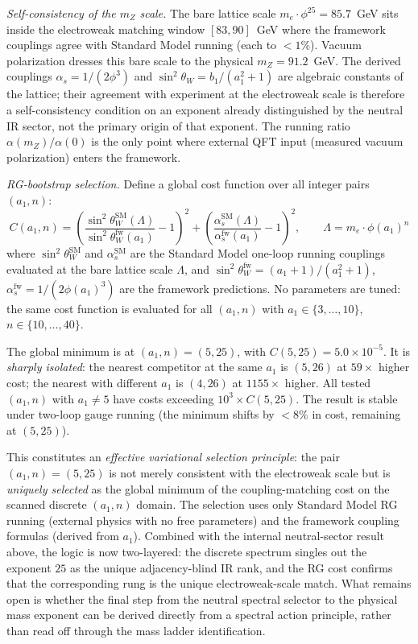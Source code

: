\documentclass[12pt,a4paper]{article}
\theoremstyle{definition}
\begin{document}
\noindent\textit{Self-consistency of the $m_Z$ scale.}  The bare lattice scale $m_e \cdot \phi^{25} = 85.7$~GeV sits inside the electroweak matching window $[83, 90]$~GeV where the framework couplings agree with Standard Model running (each to $< 1\%$).  Vacuum polarization dresses this bare scale to the physical $m_Z = 91.2$~GeV.  The derived couplings $\alpha_s = 1/(2\phi^3)$ and $\sin^2\theta_W = b_1/(a_1^2+1)$ are algebraic constants of the lattice; their agreement with experiment at the electroweak scale is therefore a self-consistency condition on an exponent already distinguished by the neutral IR sector, not the primary origin of that exponent.  The running ratio $\alpha(m_Z)/\alpha(0)$ is the only point where external QFT input (measured vacuum polarization) enters the framework.

\noindent\textit{RG-bootstrap selection.}  Define a global cost function over all integer pairs $(a_1, n)$:
\begin{equation}
C(a_1, n) = \left(\frac{\sin^2\theta_W^{\mathrm{SM}}(\Lambda)}{\sin^2\theta_W^{\mathrm{fw}}(a_1)} - 1\right)^2 + \left(\frac{\alpha_s^{\mathrm{SM}}(\Lambda)}{\alpha_s^{\mathrm{fw}}(a_1)} - 1\right)^2, \qquad \Lambda = m_e \cdot \phi(a_1)^n
\label{eq:rg_cost}
\end{equation}
where $\sin^2\theta_W^{\mathrm{SM}}$ and $\alpha_s^{\mathrm{SM}}$ are the Standard Model one-loop running couplings evaluated at the bare lattice scale $\Lambda$, and $\sin^2\theta_W^{\mathrm{fw}} = (a_1+1)/(a_1^2+1)$, $\alpha_s^{\mathrm{fw}} = 1/(2\phi(a_1)^3)$ are the framework predictions.  No parameters are tuned: the same cost function is evaluated for all $(a_1, n)$ with $a_1 \in \{3, \ldots, 10\}$, $n \in \{10, \ldots, 40\}$.

The global minimum is at $(a_1, n) = (5, 25)$, with $C(5,25) = 5.0 \times 10^{-5}$.  It is \emph{sharply isolated}: the nearest competitor at the same $a_1$ is $(5, 26)$ at $59\times$ higher cost; the nearest with different $a_1$ is $(4, 26)$ at $1155\times$ higher.  All tested $(a_1, n)$ with $a_1 \ne 5$ have costs exceeding $10^3 \times C(5,25)$.  The result is stable under two-loop gauge running (the minimum shifts by $< 8\%$ in cost, remaining at $(5,25)$).

This constitutes an \emph{effective variational selection principle}: the pair $(a_1, n) = (5, 25)$ is not merely consistent with the electroweak scale but is \emph{uniquely selected} as the global minimum of the coupling-matching cost on the scanned discrete $(a_1, n)$ domain.  The selection uses only Standard Model RG running (external physics with no free parameters) and the framework coupling formulas (derived from $a_1$).  Combined with the internal neutral-sector result above, the logic is now two-layered: the discrete spectrum singles out the exponent $25$ as the unique adjacency-blind IR rank, and the RG cost confirms that the corresponding rung is the unique electroweak-scale match.  What remains open is whether the final step from the neutral spectral selector to the physical mass exponent can be derived directly from a spectral action principle, rather than read off through the mass ladder identification.
\end{document}
